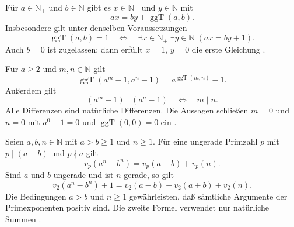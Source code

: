 \begin{theorem}
\label{b10guide:thm:natural-bezout}
Für $a\in\mathbb N_+$ und $b\in\mathbb N$ gibt es
$x\in\mathbb N_+$ und $y\in\mathbb N$ mit
\[
 ax=by+\operatorname{ggT}(a,b).
\]
Insbesondere gilt unter denselben Voraussetzungen
\[
 \operatorname{ggT}(a,b)=1
 \quad\Longleftrightarrow\quad
 \exists x\in\mathbb N_+\;\exists y\in\mathbb N\;(ax=by+1).
\]
Auch $b=0$ ist zugelassen; dann erfüllt $x=1$, $y=0$ die erste
Gleichung \cite{natbezout}.
\end{theorem}

\begin{theorem}
\label{b10guide:thm:gcd-power-differences}
Für $a\ge2$ und $m,n\in\mathbb N$ gilt
\[
 \operatorname{ggT}(a^m-1,a^n-1)
    =a^{\operatorname{ggT}(m,n)}-1.
\]
Außerdem gilt
\[
 (a^m-1)\mid(a^n-1)\quad\Longleftrightarrow\quad m\mid n.
\]
Alle Differenzen sind natürliche Differenzen. Die Aussagen schließen
$m=0$ und $n=0$ mit $a^0-1=0$ und
$\operatorname{ggT}(0,0)=0$ ein \cite{natgcd}.
\end{theorem}


\begin{theorem}
\label{b10guide:thm:lte}
Seien $a,b,n\in\mathbb N$ mit $a>b\ge1$ und $n\ge1$.
Für eine ungerade Primzahl $p$ mit $p\mid(a-b)$ und $p\nmid a$ gilt
\[
 v_p(a^n-b^n)=v_p(a-b)+v_p(n).
\]
Sind $a$ und $b$ ungerade und ist $n$ gerade, so gilt
\[
 v_2(a^n-b^n)+1=v_2(a-b)+v_2(a+b)+v_2(n).
\]
Die Bedingungen $a>b$ und $n\ge1$ gewährleisten, daß sämtliche
Argumente der Primexponenten positiv sind. Die zweite Formel
verwendet nur natürliche Summen \cite{natlte}.
\end{theorem}
